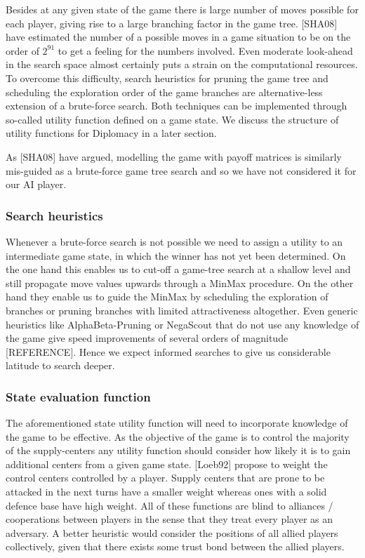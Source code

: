 \documentclass[12pt]{article}
\begin{document}
Besides at any given state of the game there is large number of moves possible
for each player, giving rise to a large branching factor in the game tree. [SHA08]
have estimated the number of a possible moves in a game situation to be on the order
of $2^{91}$ to get a feeling for the numbers involved. Even moderate look-ahead in
the search space almost certainly puts a strain on the computational resources.
To overcome this difficulty, search heuristics for pruning the game tree and scheduling
the exploration order of the game branches are alternative-less extension of a
brute-force search. Both techniques can be implemented through so-called utility function
defined on a game state. We discuss the structure of utility functions for Diplomacy
in a later section.

As [SHA08] have argued, modelling the game with payoff matrices is similarly mis-guided
as a brute-force game tree search and so we have not considered it for our AI player.

\subsubsection{Search heuristics}

Whenever a brute-force search is not possible we need to assign a utility to an 
intermediate game state, in which the winner has not yet been determined. On the 
one hand this enables us to cut-off a game-tree search at a shallow level and
still propagate move values upwards through a MinMax procedure. On the other hand
they enable us to guide the MinMax by scheduling the exploration of branches or
pruning branches with limited attractiveness altogether. Even generic heuristics
like AlphaBeta-Pruning or NegaScout that do not use any knowledge of the game give
speed improvements of several orders of magnitude [REFERENCE]. Hence we expect
informed searches to give us considerable latitude to search deeper. 

\subsubsection{State evaluation function}

The aforementioned state utility function will need to incorporate knowledge
of the game to be effective. As the objective of the game is to control the 
majority of the supply-centers any utility function should consider how likely
it is to gain additional centers from a given game state. [Loeb92] propose to 
weight the control centers controlled by a player. Supply centers that are
prone to be attacked in the next turns have a smaller weight whereas ones with
a solid defence base have high weight. All of these functions are blind to 
alliances / cooperations between players in the sense that they treat every 
player as an adversary. A better heuristic would consider the positions of
all allied players collectively, given that there exists some trust bond
between the allied players. 
\end{document}
